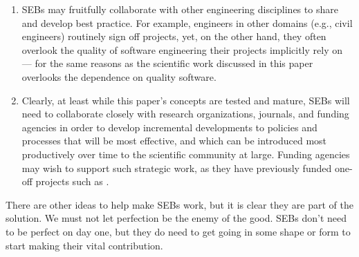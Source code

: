 \documentclass[10pt,a4paper]{article}
\begin{document}
\begin{enumerate}
\item
SEBs may fruitfully collaborate with other engineering disciplines to share and develop best practice. For example, engineers in other domains (e.g., civil engineers) routinely sign off projects, yet, on the other hand, they often overlook the quality of software engineering their projects implicitly rely on  --- for the same reasons as the scientific work discussed in this paper overlooks the dependence on quality software.

\item
Clearly, at least while this paper's concepts are tested and mature, SEBs will need to collaborate closely with research organizations, journals, and funding agencies in order to develop incremental developments to policies and processes that will be most effective, and which can be introduced most productively over time to the scientific community at large. Funding agencies may wish to support such strategic work, as they have previously funded one-off projects such as \cite{cosmos}.
\end{enumerate}
 
There are other ideas to help make SEBs work, but it is clear they are part of the solution. We must not let perfection be the enemy of the good. SEBs don't need to be perfect on day one, but they do need to get going in some shape or form to start making their vital contribution.

\end{document}

